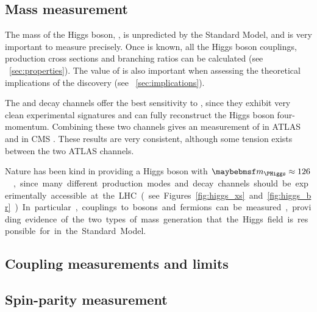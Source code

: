 



\subsection{Mass measurement}
\label{sec:searches:mass}

The mass of the Higgs boson, \mH, is unpredicted by the Standard Model, and is very 
important to measure precisely. Once \mH is known, all the Higgs boson couplings, 
production cross sections and branching ratios can be calculated (see 
\Section~\ref{sec:properties}). The value of \mH is also important when assessing the 
theoretical implications of the discovery (see \Section~\ref{sec:implications}).

The \HepProcess{\PHiggs \HepTo \Pphoton\Pphoton} and \HepProcess{\PHiggs \HepTo \PZ\PZ} 
decay channels offer the best sensitivity to \mH, since they exhibit very clean 
experimental signatures and can fully reconstruct the Higgs boson four-momentum.
Combining these two channels gives an \mH measurement of 
\unit{}{\GeV} in ATLAS \cite{ATLAS:combination:2013} and 
\unit{}{\GeV} in CMS \cite{CMS:mass}. These results are very 
consistent, although some tension exists between the two ATLAS channels.

Nature has been kind in providing a Higgs boson with \unit{$\mH \approx 126$}{\GeV}, since 
many different production modes and decay channels should be experimentally accessible at 
the LHC (see Figures~\ref{fig:higgs_xs} and \ref{fig:higgs_br}). In particular, couplings 
to bosons and fermions can be measured, providing evidence of the two types of mass 
generation that the Higgs field is responsible for in the Standard Model.




\subsection{Coupling measurements and limits}
\label{sec:searches:couplings}


\subsection{Spin-parity measurement}
\label{sec:searches:spin}

